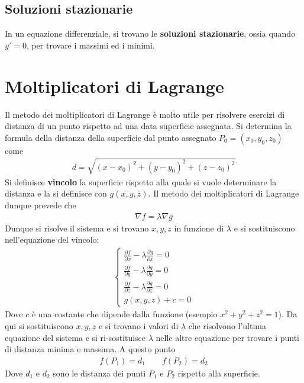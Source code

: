 \documentclass[a4paper, oneside]{book}
\begin{document}
\subsection{Soluzioni stazionarie}
In un equazione differenziale, si trovano le \textbf{soluzioni stazionarie}, 
ossia quando $y' = 0$, per trovare i massimi ed i minimi.

\section{Moltiplicatori di Lagrange}
Il metodo dei moltiplicatori di Lagrange è molto utile per risolvere esercizi di distanza
di un punto rispetto ad una data superficie assegnata. Si 
determina la formula della distanza della superficie dal punto assegnato 
$P_0 = (x_0, y_0, z_0)$ come
\begin{gather*}
    d = \sqrt{(x - x_0)^{2} + (y - y_0)^{2} + (z - z_0)^{2}} 
\end{gather*}
Si definisce \textbf{vincolo} la superficie rispetto alla quale si vuole determinare
la distanza e la si definisce con $g(x, y, z)$. Il metodo dei moltiplicatori 
di Lagrange dunque prevede che
\begin{gather*}
    \nabla f = \lambda \nabla g
\end{gather*}
Dunque si risolve il sistema e si trovano $x, y, z$ in funzione di $\lambda$
e si sostituiscono nell'equazione del vincolo:
\begin{gather*}
    \left\{\begin{array}{l}
        \frac{\partial f}{\partial x} - \lambda \frac{\partial g}{\partial x} = 0 \\
        \frac{\partial f}{\partial y} - \lambda \frac{\partial g}{\partial y} = 0 \\
        \frac{\partial f}{\partial z} - \lambda \frac{\partial g}{\partial z} = 0 \\
        g(x, y, z) + c = 0
    \end{array}\right.
\end{gather*}
Dove $c$ è una costante che dipende dalla funzione (esempio $x^{2} + y^{2} + z^{2} = 1$).
Da qui si sostituiscono $x, y, z$ e si trovano i valori di $\lambda$ che risolvono 
l'ultima equazione del sistema e si ri-sostituisce $\lambda$ nelle altre
equazione per trovare i punti di distanza minima e massima. A questo punto
\begin{gather*}
    f(P_1) = d_1 \qquad f(P_2) = d_2
\end{gather*}
Dove $d_1$ e $d_2$ sono le distanza dei punti $P_1$ e $P_2$ rispetto alla superficie.
\end{document}
